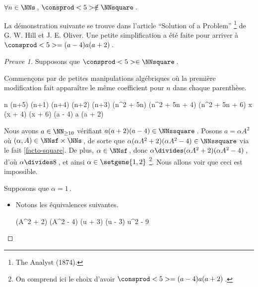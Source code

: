 \begin{fact} \label{case-6}
	 $\forall n \in \NNs$\,, $\consprod<5> \notin \NNsquare$\,.
\end{fact}




La démonstration suivante se trouve dans l'article \enquote{Solution of a Problem}
\footnote{
	The Analyst (1874).
}
de G. W. Hill et J. E. Oliver.
Une petite simplification a été faite pour arriver à $\consprod<5> = (a - 4) a (a + 2)$\,.


\begin{proof}[Preuve 1]%
    Supposons que $\consprod<5> \in \NNsquare$\,.
    
    \smallskip
    
    Commençons par de petites manipulations algébriques où la première modification fait apparaître le même coefficient pour $n$ dans chaque parenthèse.
    
    \medskip
    \begin{stepcalc}[style = sar]
	\explnext{}
		n (n+5) \cdot (n+1) (n+4) \cdot (n+2) (n+3)
	\explnext{}
		(n^2 + 5n) (n^2 + 5n + 4) (n^2 + 5n + 6)
		x (x + 4) (x + 6)
		(a - 4) a (a + 2)
    \end{stepcalc}
  
    \medskip
    Nous avons $a \in \NN_{\geq 10}$ vérifiant $a (a + 2) (a - 4) \in \NNssquare$\,. 
    Posons $a = \alpha A^2$ où $(\alpha, A) \in \NNsf \times \NNs$\,,
    de sorte que $\alpha (\alpha A^2 + 2) (\alpha A^2 - 4) \in \NNssquare$ via le fait \ref{facto-square}.
    De plus, $\alpha\in \NNsf$\,, donc $\alpha \divides (\alpha A^2 + 2) (\alpha A^2 - 4)$\,, 
    d'où $\alpha \divides 8$\,, et ainsi $\alpha \in \setgene{1, 2}$
    \footnote{
    	On comprend ici le choix d'avoir $\consprod<5> = (a - 4) a (a + 2)$\,.
    }.
    Nous allons voir que ceci est impossible.
    
    \medskip
    
    Supposons que $\alpha = 1$\,.
    
    \begin{itemize}
    	\item Notons les équivalences suivantes.
        
        \noindent\kern-6pt%
        \begin{stepcalc}[style=ar*, ope=\iff]
        	(A^2 + 2) (A^2 - 4) \in \NNssquare
        	(u + 3) (u - 3) \in \NNssquare
    	\explnext{}
        	u^2 - 9 \in \NNssquare
        \end{stepcalc}


\end{itemize}
\end{proof}
